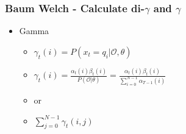 \begin{frame}
	\frametitle{Baum Welch - Calculate di-$\gamma$ and $\gamma$}
	\begin{itemize}
		\item Gamma
		\begin{itemize}
			\item $\gamma_t(i) = P(x_t = q_i|\mathcal{O},\theta)$
			\item $\gamma_t(i) = \frac{\alpha_t(i)\beta_t(i)}{P(\mathcal{O}|\theta)} = \frac{\alpha_t(i)\beta_t(i)}{\sum\limits_{i=0}^{N-1} \alpha_{T-1}(i)}$
			\item or
			\item $ \sum\limits_{j=0}^{N-1} \gamma_t(i,j)$
		\end{itemize}
	\end{itemize}
\end{frame}